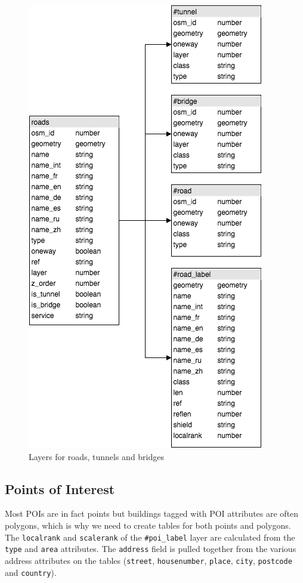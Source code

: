 \begin{figure}[h]
  \centering
  \includegraphics[scale=0.6]{images/road_layer.png}
  \caption{Layers for roads, tunnels and bridges}
\end{figure}

\newpage
\subsection{Points of Interest}
Most POIs are in fact points but buildings tagged with POI attributes
are often polygons, which is why we need to create tables for both points and polygons.
The \texttt{localrank} and \texttt{scalerank} of the \texttt{\#poi\_label} layer are calculated from the \texttt{type} and \texttt{area} attributes.
The \texttt{address} field is pulled together from the various address attributes on the tables (\texttt{street}, \texttt{housenumber}, \texttt{place}, \texttt{city}, \texttt{postcode} and \texttt{country}).

